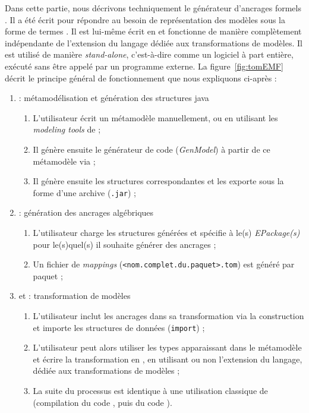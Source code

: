 Dans cette partie, nous décrivons techniquement le générateur d'ancrages
formels {\tomemf}. Il a été écrit pour répondre au besoin de représentation des
modèles {\emf} sous la forme de termes {\tom}. Il est lui-même écrit en
{\tomjava} et fonctionne de manière complètement indépendante de l'extension du
langage dédiée aux transformations de modèles. Il est utilisé de manière
\emph{stand-alone}, c'est-à-dire comme un logiciel à part entière, exécuté sans
être appelé par un programme {\tom} externe. La figure~\ref{fig:tomEMF} décrit
le principe général de fonctionnement que nous expliquons ci-après :
\begin{enumerate}
  \item {\eclipse} : métamodélisation et génération des structures {java}
    \begin{enumerate}
      \item L'utilisateur écrit un métamodèle {\ecore} manuellement, ou en
        utilisant les \emph{modeling tools} de {\eclipse} ;
      \item Il génère ensuite le générateur de code {\java} (\emph{GenModel}) 
        à partir de ce métamodèle via {\eclipse} ;
      \item Il génère ensuite les structures {\java} correspondantes et les exporte
        sous la forme d'une archive (\texttt{.jar}) ;
    \end{enumerate}
  \item {\tomemf} : génération des ancrages algébriques
    \begin{enumerate}
  \item L'utilisateur charge les structures {\java} générées et spécifie à
    {\tomemf} le(s) \emph{EPackage(s)} pour le(s)quel(s) il souhaite générer des
    ancrages ;
  \item Un fichier de \emph{mappings} (\texttt{<nom.complet.du.paquet>.tom})
    est généré par paquet ;
    \end{enumerate}
  \item {\tom} et {\java} : transformation de modèles
    \begin{enumerate}
  \item L'utilisateur inclut les ancrages dans sa transformation via la
    construction  et importe les structures de données {\java}
      (\texttt{import}) ;
    \item L'utilisateur peut alors utiliser les types apparaissant dans le
      métamodèle et écrire la transformation en {\tomjava}, en utilisant ou non
      l'extension du langage, dédiée aux transformations de modèles ;
    \item La suite du processus est identique à une utilisation classique de
      {\tom} (compilation du code {\tom}, puis du code {\java}).
    \end{enumerate}
\end{enumerate}

